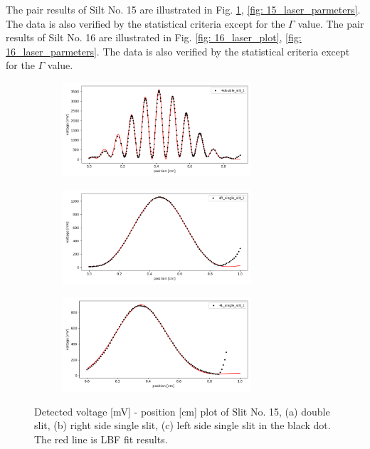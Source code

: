 \documentclass{article}
\begin{document}
The pair results of Silt No. 15 are illustrated in Fig. \ref{fig: 15_laser_plot}, \ref{fig: 15_laser_parmeters}.
The data is also verified by the statistical criteria except for the $\Gamma$ value. 
The pair results of Silt No. 16 are illustrated in Fig. \ref{fig: 16_laser_plot}, \ref{fig: 16_laser_parmeters}.
The data is also verified by the statistical criteria except for the $\Gamma$ value. 

\begin{figure}[H]
    \begin{subfigure}[b]{7cm}
        \centering
        \includegraphics[width=7cm]{../results/laser(4_double_slit)_modified_fig.png}
        \caption{}
    \end{subfigure}
    \hfill
    \begin{subfigure}[b]{7cm}
      \centering
      \includegraphics[width=7cm]{../results/laser(4_R_single_slit)_modified_fig.png}
      \caption{}
  \end{subfigure}
  \hfill
  \centering
  \begin{subfigure}[b]{7cm}
    \centering
    \includegraphics[width=7cm]{../results/laser(4_L_single_slit)_modified_fig.png}
    \caption{}
  \end{subfigure}
  \hfill
    \caption{Detected voltage [mV] - position [cm] plot of Slit No. 15, (a) double slit, (b) right side single slit, (c) left side single slit in the black dot.
        The red line is LBF fit results.
     }
    \label{fig: 15_laser_plot}
  \end{figure}
\end{document}
